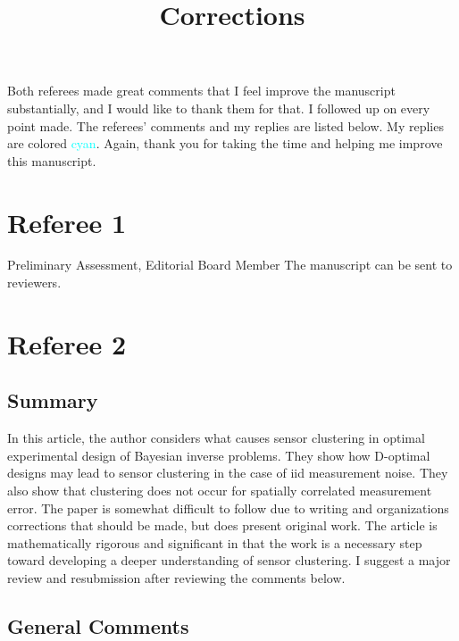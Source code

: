 \documentclass{amsart}
\title{Corrections}
\begin{document}
\maketitle

Both referees made great comments that I feel improve the manuscript
substantially, and I would like to thank them for that. I followed up
on every point made. The referees' comments and my replies are listed
below. My replies are colored \textcolor{cyan}{cyan}. Again, thank you
for taking the time and helping me improve this manuscript.

\section{Referee 1}
Preliminary Assessment, Editorial Board Member The manuscript can be
sent to reviewers.


\section{Referee 2}
\subsection{Summary}
In this article, the author considers what causes sensor clustering in
optimal experimental design of Bayesian inverse problems. They show
how D-optimal designs may lead to sensor clustering in the case of iid
measurement noise. They also show that clustering does not occur for
spatially correlated measurement error. The paper is somewhat
difficult to follow due to writing and organizations corrections that
should be made, but does present original work. The article is
mathematically rigorous and significant in that the work is a
necessary step toward developing a deeper understanding of sensor
clustering. I suggest a major review and resubmission after reviewing
the comments below.


\subsection{General Comments}
\end{document}
